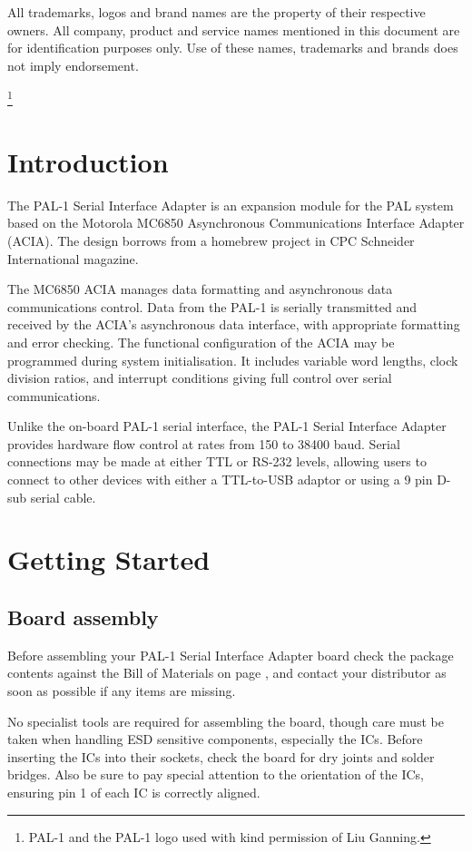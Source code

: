 \documentclass[a4paper,11pt,twoside,openright]{report}
\newcommand\mainmatter{
  \cleardoublepage
  \pagenumbering{arabic}}
\begin{document}
All trademarks, logos and brand names are the property of their respective owners. All company, product and service names mentioned in this document are for identification purposes only. Use of these names, trademarks and brands does not imply endorsement.

\thanks{PAL-1 and the PAL-1 logo used with kind permission of Liu Ganning.}
\clearpage
\tableofcontents
\cleardoublepage
\chapter*{Introduction}
The PAL-1 Serial Interface Adapter is an expansion module for the PAL system\cite{ganning1} based on the Motorola MC6850 Asynchronous Communications Interface Adapter (ACIA)\cite{motorola1}. The design borrows from a homebrew project in CPC Schneider International magazine\cite[pp. 88-92]{cpc1}. 

The MC6850 ACIA manages data formatting and asynchronous data communications control. Data from the PAL-1 is serially transmitted and received by the ACIA's asynchronous data interface, with appropriate formatting and error checking. The functional configuration of the ACIA may be programmed during system initialisation. It includes variable word lengths, clock division ratios, and interrupt conditions giving full control over serial communications\cite[p.11]{motorola2}.  

Unlike the on-board PAL-1 serial interface, the PAL-1 Serial Interface Adapter provides hardware flow control at rates from 150 to 38400 baud. Serial connections may be made at either TTL or RS-232 levels, allowing users to connect to other devices with either a TTL-to-USB adaptor or using a 9 pin D-sub serial cable. 

\mainmatter
\chapter{Getting Started}
\section*{Board assembly}
Before assembling your PAL-1 Serial Interface Adapter board check the package contents against the Bill of Materials on page \pageref{sec:bom}, and contact your distributor as soon as possible if any items are missing.

No specialist tools are required for assembling the board, though care must be taken when handling ESD sensitive components, especially the ICs. Before inserting the ICs into their sockets, check the board for dry joints and solder bridges. Also be sure to pay special attention to the orientation of the ICs, ensuring pin 1 of each IC is correctly aligned.
\end{document}
